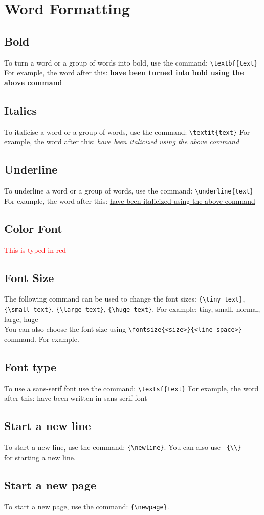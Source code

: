 \section{Word Formatting}

\subsection{Bold}
To turn a word or a group of words into bold, use the command: \verb+\textbf{text}+
For example, the word after this: \textbf{have been turned into bold using the above command}

\subsection{Italics}
To italicise a word or a group of words, use the command: \verb+\textit{text}+
For example, the word after this: \textit{have been italicized using the above command}

\subsection{Underline}
To underline a word or a group of words, use the command: \verb+\underline{text}+
For example, the word after this: \underline{have been italicized using the above command}

\subsection{Color Font}
\textcolor{red}{This is typed in red}

\subsection{Font Size}
The following command can be used to change the font sizes: \verb+{\tiny text}+,
\verb+{\small text}+, \verb+{\large text}+, \verb+{\huge text}+. For example:
{\tiny tiny}, {\small small}, normal, {\large large},  {\huge huge} \\

You can also choose the font size using \verb+\fontsize{<size>}{<line space>}+ command.
For example. {}

\subsection{Font type}
To use a sans-serif font use the command: \verb+\textsf{text}+
For example, the word after this: \textsf{have been written in sans-serif font}

\subsection{Start a new line}
To start a new line, \newline use the command: \verb+{\newline}+. You can also use \verb+ {\\}+
\\ for starting a new line.

\subsection{Start a new page}
To start a new page, \newpage use the command: \verb+{\newpage}+.